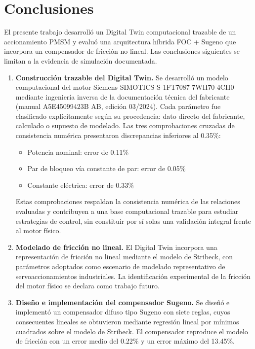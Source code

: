 \chapter{Conclusiones}
\label{cap:conclusiones}

El presente trabajo desarrolló un Digital Twin computacional trazable de un accionamiento PMSM y evaluó una arquitectura híbrida FOC + Sugeno que incorpora un compensador de fricción no lineal. Las conclusiones siguientes se limitan a la evidencia de simulación documentada.

\begin{enumerate}

\item \textbf{Construcción trazable del Digital Twin.} Se desarrolló un modelo computacional del motor Siemens SIMOTICS S-1FT7087-7WH70-4CH0 mediante ingeniería inversa de la documentación técnica del fabricante (manual A5E45099423B AB, edición 03/2024). Cada parámetro fue clasificado explícitamente según su procedencia: dato directo del fabricante, calculado o supuesto de modelado. Las tres comprobaciones cruzadas de consistencia numérica presentaron discrepancias inferiores al 0.35\%:
\begin{itemize}
\item Potencia nominal: error de 0.11\%
\item Par de bloqueo vía constante de par: error de 0.05\%
\item Constante eléctrica: error de 0.33\%
\end{itemize}
Estas comprobaciones respaldan la consistencia numérica de las relaciones evaluadas y contribuyen a una base computacional trazable para estudiar estrategias de control, sin constituir por sí solas una validación integral frente al motor físico.

\item \textbf{Modelado de fricción no lineal.} El Digital Twin incorpora una representación de fricción no lineal mediante el modelo de Stribeck, con parámetros adoptados como escenario de modelado representativo de servoaccionamientos industriales. La identificación experimental de la fricción del motor físico se declara como trabajo futuro.

\item \textbf{Diseño e implementación del compensador Sugeno.} Se diseñó e implementó un compensador difuso tipo Sugeno con siete reglas, cuyos consecuentes lineales se obtuvieron mediante regresión lineal por mínimos cuadrados sobre el modelo de Stribeck. El compensador reproduce el modelo de fricción con un error medio del 0.22\% y un error máximo del 13.45\%.


\end{enumerate}
